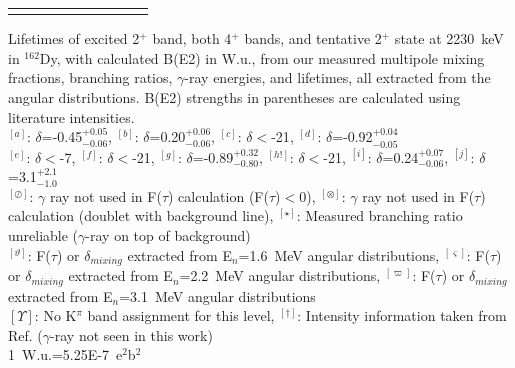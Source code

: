 \begin{landscape}
\begin{center}
\begin{longtable}{cllcccllll}
\vspace{10pt}
\end{longtable}
\end{center}
Lifetimes of excited 2$^+$ band, both 4$^+$ bands, and tentative 2$^+$ state at 2230~keV in $^{162}$Dy, with calculated B(E2) in W.u., from our measured multipole mixing fractions, branching ratios, $\gamma$-ray energies, and lifetimes, all extracted from the angular distributions. B(E2) strengths in parentheses are calculated using literature intensities.\\
{\small $^{[a]}$: $\delta$=-0.45$^{+0.05}_{-0.06}$},
{\small $^{[b]}$: $\delta$=0.20$^{+0.06}_{-0.06}$},
{\small $^{[c]}$: $\delta<$-21},
{\small $^{[d]}$: $\delta$=-0.92$^{+0.04}_{-0.05}$}\\
{\small $^{[e]}$: $\delta<$-7},
{\small $^{[f]}$: $\delta<$-21},
{\small $^{[g]}$: $\delta$=-0.89$^{+0.32}_{-0.80}$},
{\small $^{[h!]}$: $\delta<$-21},
{\small $^{[i]}$: $\delta$=0.24$^{+0.07}_{-0.06}$},
{\small $^{[j]}$: $\delta$=3.1$^{+2.1}_{-1.0}$}\\
{\small $^{[\oslash]}$: $\gamma$ ray not used in F($\tau$) calculation (F($\tau$)$<$0),}
{\small $^{[\otimes]}$: $\gamma$ ray not used in F($\tau$) calculation (doublet with background line),}
{\small $^{[\star]}$: Measured branching ratio unreliable ($\gamma$-ray on top of background)}\\
{\small $^{[\vartheta]}$: F($\tau$) or $\delta_{mixing}$ extracted from E$_n$=1.6~MeV angular distributions},
{\small $^{[\varsigma]}$: F($\tau$) or $\delta_{mixing}$ extracted from E$_n$=2.2~MeV angular distributions},
{\small $^{[\varpi]}$: F($\tau$) or $\delta_{mixing}$ extracted from E$_n$=3.1~MeV angular distributions}\\
{\small $[\Upsilon]$: No K$^\pi$ band assignment for this level},
{\small $^{[\dagger]}$: Intensity information taken from Ref. \cite{Wu_2minus_2001} ($\gamma$-ray not seen in this work)}\\
{\small 1~W.u.=5.25E-7~e$^2$b$^2$}


\end{landscape}

